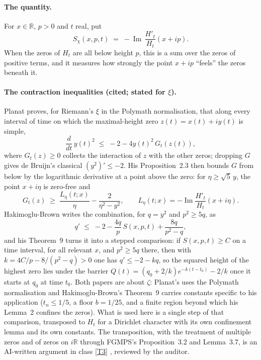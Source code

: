 \documentclass[11pt]{article}
\theoremstyle{definition}
\newcommand{\im}{\operatorname{Im}}
\newcommand{\R}{\mathbb{R}}
\begin{document}
\paragraph{The quantity.} For $x \in \R$, $p > 0$ and $t$ real, put
\[
S_\chi(x,p,t) \;=\; -\im\,\frac{H'_t}{H_t}(x+ip) .
\]
When the zeros of $H_t$ are all below height $p$, this is a sum over the zeros of positive terms, and it measures how strongly the point $x + ip$ ``feels'' the zeros beneath it.

\paragraph{The contraction inequalities (cited; stated for $\xi$).} Planat \cite[Theorem 2.1]{Planat2026} proves, for Riemann's $\xi$ in the Polymath normalisation, that along every interval of time on which the maximal-height zero $z(t) = x(t) + iy(t)$ is simple,
\[
\frac{d}{dt}\,y(t)^2 \;\le\; -2 - 4y(t)^2\,G_t(z(t)),
\]
where $G_t(z) \ge 0$ collects the interaction of $z$ with the other zeros; dropping $G$ gives de Bruijn's classical $(y^2)' \le -2$. His Proposition~2.3 then bounds $G$ from below by the logarithmic derivative at a point above the zero: for $\eta \ge \sqrt5\,y$, the point $x + i\eta$ is zero-free and
\[
G_t(z) \;\ge\; \frac{L_\eta(t;x)}{\eta} - \frac{2}{\eta^2 - y^2},\qquad L_\eta(t;x) = -\im\frac{H'_t}{H_t}(x+i\eta).
\]
Hakimoglu-Brown \cite[p.~9]{HakimogluBrown2026} writes the combination, for $q = y^2$ and $p^2 \ge 5q$, as
\begin{equation}\label{eq:HBineq}
q' \;\le\; -2 - \frac{4q}{p}\,S(x,p,t) + \frac{8q}{p^2 - q},
\end{equation}
and his Theorem~9 turns it into a stepped comparison: if $S(x,p,t) \ge C$ on a time interval, for all relevant $x$, and $p^2 \ge 5q$ there, then with $k = 4C/p - 8/(p^2 - q) > 0$ one has $q' \le -2 - kq$, so the squared height of the highest zero lies under the barrier $Q(t) = (q_0 + 2/k)e^{-k(t - t_0)} - 2/k$ once it starts at $q_0$ at time $t_0$. Both papers are about $\zeta$: Planat's uses the Polymath normalisation and Hakimoglu-Brown's Theorem~9 carries constants specific to his application ($t_n \le 1/5$, a floor $b = 1/25$, and a finite region beyond which his Lemma~2 confines the zeros). What is used here is a single step of that comparison, transposed to $H_t$ for a Dirichlet character with its own confinement lemma and its own constants. The transposition, with the treatment of multiple zeros and of zeros on $i\R$ through FGMPS's Proposition~3.2 and Lemma~3.7, is an AI-written argument in class \ref{T3} \cite[P5 memo \S A.13.3; Y3 memo \S3.2]{dq1records}, reviewed by the auditor.
\end{document}
